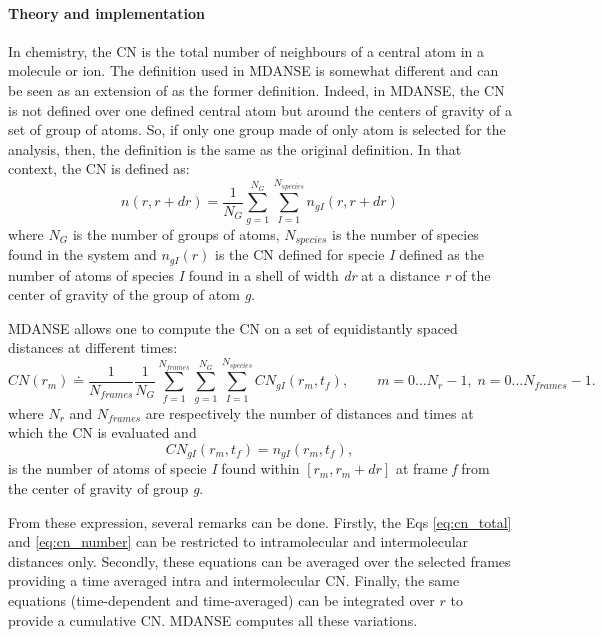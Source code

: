\documentclass[a4paper,11pt]{article}
\begin{document}
\paragraph{Theory and implementation\\}
\label{cn_theory}
In chemistry, the \gls{CN} is the total number of neighbours of a central atom in a molecule or ion. The definition used in \gls{MDANSE} is somewhat 
different and can be seen as an extension of as the former definition. Indeed, in \gls{MDANSE}, the \gls{CN} is not defined over one defined central atom but around 
the centers of gravity of a set of group of atoms. So, if only one group made of only atom is selected for the analysis, then, the 
definition is the same as the original definition. In that context, the \gls{CN} is defined as:
\begin{equation}
n(r, r+dr) = \frac{1}{N_{G}}\sum_{g=1}^{N_{G}}\sum_{I=1}^{N_{species}} n_{gI}(r, r+dr)
\end{equation}
where $N_{G}$ is the number of groups of atoms, $N_{species}$ is the number of species found in the system and 
$n_{gI}(r)$ is the \gls{CN} defined for specie \textit{I} defined as the number of atoms of species \textit{I} found 
in a shell of width \textit{dr} at a distance \textit{r} of the center of gravity of the group of atom \textit{g}.

\gls{MDANSE} allows one to compute the \gls{CN} on a set of equidistantly spaced distances at different times:
\begin{equation}
\label{eq:cn_total}
CN(r_m) \doteq \frac{1}{N_{frames}}\frac{1}{N_{G}}\sum_{f=1}^{N_{frames}}\sum_{g=1}^{N_{G}}\sum_{I=1}^{N_{species}} CN_{gI}(r_m, t_f),
\qquad m = 0\ldots N_r - 1,\; n = 0\ldots N_{frames} - 1.
\end{equation}
where $N_r$ and $N_{frames}$ are respectively the number of distances and times at which the \gls{CN} is evaluated and
\begin{equation}
\label{eq:cn_number}
CN_{gI}(r_m, t_f) = n_{gI}(r_m, t_f),
\end{equation}
is the number of atoms of specie \textit{I} found within $[r_m,r_m + dr]$ at frame \textit{f} from the center of gravity of group \textit{g}.

From these expression, several remarks can be done. Firstly, the Eqs \ref{eq:cn_total} and \ref{eq:cn_number} can be restricted 
to intramolecular and intermolecular distances only. Secondly, these equations can be averaged over the selected frames providing a time averaged intra and intermolecular 
\gls{CN}. Finally, the same equations (time-dependent and time-averaged) can be integrated over $r$ to provide a 
cumulative \gls{CN}. \gls{MDANSE} computes all these variations. 
\end{document}
